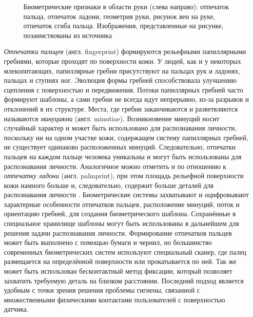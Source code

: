 \documentclass[12pt]{book}
\begin{document}
\begin{figure}[h]
\caption{Биометрические признаки в области руки (слева направо): отпечаток пальца, отпечаток ладони, геометрия руки, рисунок вен на руке, отпечаток сгиба пальца. Изображения, представленные на рисунке, позаимствованы из источника \cite{unar_2014}}
\label{fig:figure_1_2}
\end{figure}

\large{\textit{Отпечатки пальцев} (англ. fingerprint) формируются рельефными папиллярными гребнями, которые проходят по поверхности кожи. У людей, как и у некоторых млекопитающих, папиллярные гребни присутствуют на пальцах рук и ладонях, пальцах и ступнях ног. Эволюция формы гребней способствовала улучшению сцепления с поверхностью и передвижения. Потоки папиллярных гребней часто формируют шаблоны, а сами гребни не всегда идут непрерывно, из-за разрывов и отклонений в их структуре. Места, где гребни заканчиваются и разветвляются называются \textit{минуциями} (англ. minutiae). Возникновение минуций носит случайный характер и может быть использовано для распознавания личности, поскольку ни на одном участке кожи, содержащем систему папиллярных гребней, не существует одинаково расположенных минуций. Следовательно, отпечатки пальцев на каждом пальце человека уникальны и могут быть использованы для распознавания личности. Аналогичное можно отметить и по отношению к \textit{отпечатку ладони} (англ. palmprint), при этом площадь рельефной поверхности кожи намного больше и, следовательно, содержит больше деталей для распознавания личности \cite{unar_2014, minaee_2023, gao_2025}. Биометрические системы захватывают и оцифровывают характерные особенности отпечатков пальцев, расположение минуций, поток и ориентацию гребней, для создания биометрического шаблона. Сохранённые в специальное хранилище шаблоны могут быть использованы в дальнейшем для решения задачи распознавания личности. Формирование отпечатков пальцев может быть выполнено с помощью бумаги и чернил, но большинство современных биометрических систем используют специальный сканер, где палец размещается на определённой поверхности или прокатывается по ней. Так же может быть использован бесконтактный метод фиксации, который позволяет захватить требуемую деталь на близком расстоянии. Последний подход является удобным с точки зрения решения проблемы гигиены, связанной с множественными физическими контактами пользователей с поверхностью датчика.} 
\end{document}
